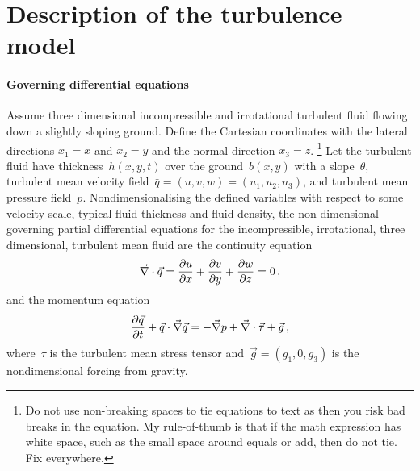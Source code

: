 \documentclass[12pt,a5paper]{article}
\begin{document}
\section{Description of the turbulence model}
\label{description}

\paragraph{Governing differential equations} 
Assume three dimensional incompressible and irrotational turbulent fluid flowing down a slightly sloping ground. 
Define the Cartesian coordinates with the lateral directions $x_1=x$ and $x_2=y$ and the normal direction $x_3=z$. 
\footnote{Do not use non-breaking spaces to tie equations to text as then you risk bad breaks in the equation.  My rule-of-thumb is that if the math expression has white space, such as the small space around equals or add, then do not tie.  Fix everywhere.}
Let the turbulent fluid have thickness~$h(x,y,t)$ over the ground~$b(x,y)$ with a slope~$\theta$, turbulent mean velocity field~$\bar q=(u,v,w)=(u_1,u_2,u_3)$, and turbulent mean pressure field~$p$.
Nondimensionalising the defined variables with respect to some velocity scale, typical fluid thickness and fluid density, the non-dimensional governing partial differential equations for the incompressible, irrotational, three dimensional, turbulent mean fluid are the continuity equation
\begin{equation}
    \divv\vec q=\D xu+\D yv+\D zw=0\,,\label{eq:cont}
\end{equation}
and the momentum equation
\begin{equation}
    \D t{\vec q} +\vec q\cdot\grad\vec q
    =-\grad p +\divv\vec\tau +\vec{g}\,,\label{eq:mom}
\end{equation}
where~$\tau$ is the turbulent mean stress tensor and~$\vec g=(g_1,0,g_3)$ is the nondimensional forcing from gravity.
\end{document}
